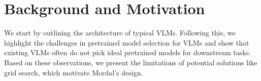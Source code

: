
\section{Background and Motivation}
\label{sec:background}

We start by outlining the architecture of typical VLMs. Following this, we highlight the challenges in pretrained model selection for VLMs and show that existing VLMs often do not pick ideal pretrained models for downstream tasks. Based on these observations, we present the limitations of potential solutions like grid search, which motivate Mordal's design.


